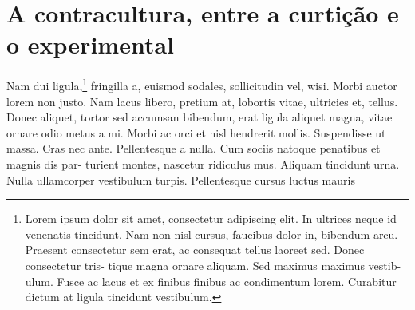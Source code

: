 \part{A contracultura, entre a curtição e o experimental}

\lipsum

Nam dui ligula,\footnote{Lorem ipsum dolor sit amet, consectetur adipiscing elit. In
ultrices neque id venenatis tincidunt. Nam non nisl cursus,
faucibus dolor in, bibendum arcu. Praesent consectetur sem
erat, ac consequat tellus laoreet sed. Donec consectetur tris-
tique magna ornare aliquam. Sed maximus maximus vestib-
ulum. Fusce ac lacus et ex finibus finibus ac condimentum
lorem. Curabitur dictum at ligula tincidunt vestibulum.} fringilla a, euismod sodales, sollicitudin
vel, wisi. Morbi auctor lorem non justo. Nam lacus libero,
pretium at, lobortis vitae, ultricies et, tellus. Donec aliquet,
tortor sed accumsan bibendum, erat ligula aliquet magna,
vitae ornare odio metus a mi. Morbi ac orci et nisl hendrerit
mollis. Suspendisse ut massa. Cras nec ante. Pellentesque
a nulla. Cum sociis natoque penatibus et magnis dis par-
turient montes, nascetur ridiculus mus. Aliquam tincidunt
urna. Nulla ullamcorper vestibulum turpis. Pellentesque
cursus luctus mauris

\pagebreak

\thispagestyle{empty}

\vspace*{-80pt}

